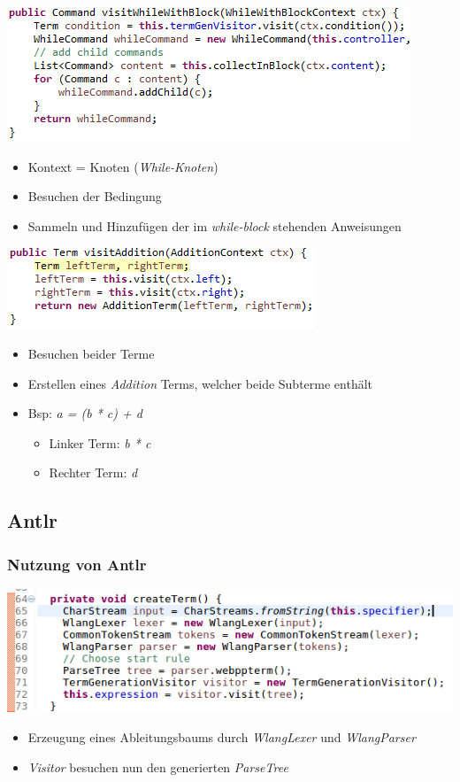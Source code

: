 \documentclass{beamer}
\begin{document}
\begin{frame}
\includegraphics[scale=0.5]{../document_data/visitWhile.png}
\begin{itemize}
\item Kontext = Knoten (\textit{While-Knoten})
\item Besuchen der Bedingung
\item Sammeln und Hinzufügen der im \textit{while-block} stehenden Anweisungen
\end{itemize}
\end{frame}
\begin{frame}
\includegraphics[scale=0.5]{../document_data/visitAddition.png}
\begin{itemize}
\item Besuchen beider Terme
\item Erstellen eines \textit{Addition} Terms, welcher beide Subterme enthält
\item Bsp: \textit{a = (b * c) + d}
\begin{itemize}
\item Linker Term: \textit{b * c}
\item Rechter Term: \textit{d}
\end{itemize}
\end{itemize}
\end{frame}

\subsection{Antlr}
\begin{frame}
\frametitle{Nutzung von Antlr}
\includegraphics[scale=0.5]{../document_data/createTerm.png}
\begin{itemize}
\item Erzeugung eines Ableitungsbaums durch \textit{WlangLexer} und \textit{WlangParser}
\item \textit{Visitor} besuchen nun den generierten \textit{ParseTree}
\end{itemize}
\end{frame}
\end{document}
